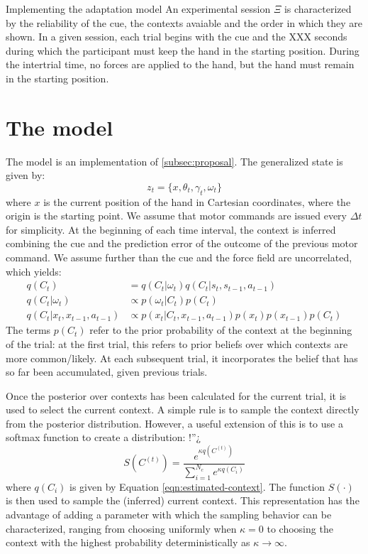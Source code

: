 \documentclass{report}
\def \eref #1{Equation \ref{#1}}   %
\begin{document}
\begin{chapter}{Implementing the adaptation model}
An experimental session $\Xi$ is characterized by the reliability of the cue,
the contexts avaiable and the order in which they are shown. In a given
session, each trial begins with the cue and the XXX seconds during which the
participant must keep the hand in the starting position. During the intertrial
time, no forces are applied to the hand, but the hand must remain in the
starting position.
 
\section{The model}
\label{sec:model-instance}
The model is an implementation of \ref{subsec:proposal}. The generalized state
is given by:
\begin{equation}
z_t = \{x, \theta_t, \gamma_t, \omega_t\}
\end{equation}
where $x$ is the current position of the hand in Cartesian coordinates,
where the origin is the starting point. We assume that motor commands are
issued every $\Delta t$ for simplicity. At the beginning of each time interval,
the context is inferred combining the cue and the prediction error of the
outcome of the previous motor command. We assume further than the cue and the
force field are uncorrelated, which yields:
\begin{align}
  q(C_t) &= q(C_t | \omega_t)q(C_t | s_t, s_{t-1}, a_{t-1}) \\ \label{eqn:estimated-context}
  q(C_t | \omega_t) &\propto p(\omega_t | C_t)p(C_t) \\
  q(C_t | x_t, x_{t-1}, a_{t-1}) &\propto p(x_t | C_t, x_{t-1}, a_{t-1})p(x_t)p(x_{t-1})p(C_t)
\end{align}
The terms $p(C_t)$ refer to the prior probability of the context at
the beginning of the trial: at the first trial, this refers to prior beliefs
over which contexts are more common/likely. At each subsequent trial, it
incorporates the belief that has so far been accumulated, given previous
trials.

Once the posterior over contexts has been calculated for the current trial, it
is used to select the current context. A simple rule is to sample the context
directly from the posterior distribution. However, a useful extension of this
is to use a softmax function to create a distribution:
 !''¿
\begin{equation}
S(C^{(t)}) = \frac{e^{\kappa
q\left(C^{(t)}\right)}}{\displaystyle \sum_{i=1}^{N_c}e^{\kappa
q\left(C_i\right)}}
\end{equation}
where $q(C_i)$ is given by \eref{eqn:estimated-context}. The
function $S(\cdot)$ is then used to sample the (inferred) current context. This
representation has the advantage of adding a parameter with which the sampling
behavior can be characterized, ranging from choosing uniformly when $\kappa =
0$ to choosing the context with the highest probability deterministically as
$\kappa \rightarrow \infty$.


\end{chapter}
\end{document}
